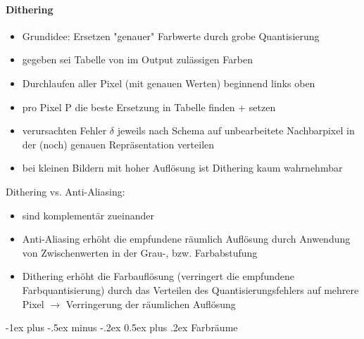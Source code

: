 \documentclass[10pt,landscape]{article}
\makeatletter
\renewcommand{\section}{\@startsection{section}{1}{0mm}%
                                {-1ex plus -.5ex minus -.2ex}%
                                {0.5ex plus .2ex}%
                                {\normalfont\large\bfseries}}
\makeatother
\begin{document}
\begin{multicols}{3}
\paragraph{Dithering}
\begin{itemize}
  \item Grundidee: Ersetzen "genauer" Farbwerte durch grobe Quantisierung
  \item gegeben sei Tabelle von im Output zulässigen Farben
  \item Durchlaufen aller Pixel (mit genauen Werten) beginnend links oben
  \item pro Pixel P die beste Ersetzung in Tabelle finden + setzen
  \item verursachten Fehler $\delta$ jeweils nach Schema auf unbearbeitete Nachbarpixel in der (noch) genauen Repräsentation verteilen
  \item bei kleinen Bildern mit hoher Auflösung ist Dithering kaum wahrnehmbar
\end{itemize}
Dithering vs. Anti-Aliasing:
\begin{itemize}
  \item sind komplementär zueinander
  \item Anti-Aliasing erhöht die empfundene räumlich Auflösung durch Anwendung von Zwischenwerten in der Grau-, bzw. Farbabstufung
  \item Dithering erhöht die Farbauflösung (verringert die empfundene Farbquantisierung) durch das Verteilen des Quantisierungsfehlers auf mehrere Pixel $\rightarrow$ Verringerung der räumlichen Auflösung
\end{itemize}

\section{Farbräume}

\end{multicols}
\end{document}
